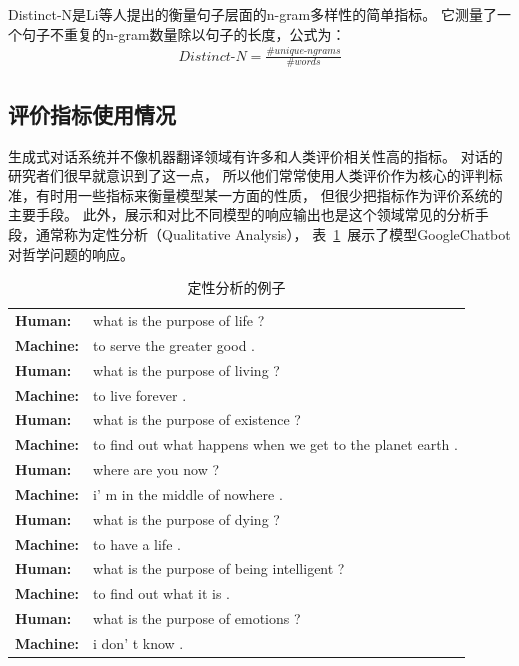 Distinct-N是Li等人提出的衡量句子层面的n-gram多样性的简单指标。
它测量了一个句子不重复的n-gram数量除以句子的长度，公式为：
\begin{align}
    \textit{Distinct-N} = \frac{\#\textit{unique-ngrams}}{\#\textit{words}}
\end{align}

\subsection{评价指标使用情况}\label{subsec:metrics_usage}
生成式对话系统并不像机器翻译领域有许多和人类评价相关性高的指标。
对话的研究者们很早就意识到了这一点，
所以他们常常使用人类评价作为核心的评判标准，有时用一些指标来衡量模型某一方面的性质，
但很少把指标作为评价系统的主要手段。
此外，展示和对比不同模型的响应输出也是这个领域常见的分析手段，通常称为定性分析（Qualitative Analysis），
表~\ref{tab:qualitative_analysis}~展示了模型GoogleChatbot对哲学问题的响应。
\begin{table}[H]
    \centering
    \caption{定性分析的例子}
    \label{tab:qualitative_analysis}
    \begin{tabular}{ll}
        \textbf{Human:} & what is the purpose of life ? \\
        \textbf{Machine:} & to serve the greater good .\\
        \textbf{Human:} & what is the purpose of living ? \\
        \textbf{Machine:} & to live forever . \\
        \textbf{Human:} & what is the purpose of existence ? \\
        \textbf{Machine:} & to find out what happens when we get
        to the planet earth . \\
        \textbf{Human:} & where are you now ? \\
        \textbf{Machine:} & i' m in the middle of nowhere . \\
        \textbf{Human:} & what is the purpose of dying ? \\
        \textbf{Machine:} & to have a life . \\
        \textbf{Human:} & what is the purpose of being intelligent ? \\
        \textbf{Machine:} & to find out what it is . \\
        \textbf{Human:} & what is the purpose of emotions ? \\
        \textbf{Machine:} & i don' t know .
    \end{tabular}
\end{table}

